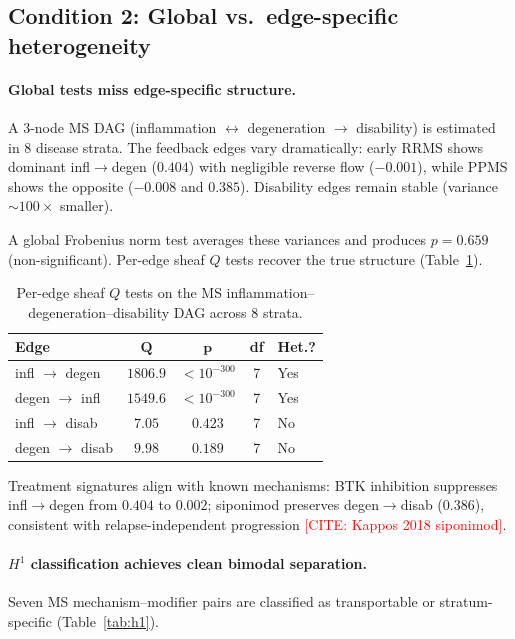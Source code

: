 \documentclass[11pt]{article}
\newcommand{\misscite}[1]{\textcolor{red}{[CITE: #1]}}
\begin{document}
\subsection{Condition 2: Global vs.\ edge-specific heterogeneity}
\label{sec:res-global-vs-edge}

\paragraph{Global tests miss edge-specific structure.}
A 3-node MS DAG (inflammation $\leftrightarrow$ degeneration $\to$ disability) is estimated in 8 disease strata.
The feedback edges vary dramatically: early RRMS shows dominant infl$\to$degen ($0.404$) with negligible reverse flow ($-0.001$), while PPMS shows the opposite ($-0.008$ and $0.385$).
Disability edges remain stable (variance $\sim\!100\times$ smaller).

A global Frobenius norm test averages these variances and produces $p = 0.659$ (non-significant).
Per-edge sheaf $Q$ tests recover the true structure (Table~\ref{tab:dag}).

\begin{table}[t]
\centering
\caption{Per-edge sheaf $Q$ tests on the MS inflammation--degeneration--disability DAG across 8 strata.}
\label{tab:dag}
\small
\begin{tabular}{@{}lcccl@{}}
\toprule
\textbf{Edge} & $\boldsymbol{Q}$ & $\boldsymbol{p}$ & \textbf{df} & \textbf{Het.?} \\
\midrule
infl $\to$ degen & $1806.9$ & $< 10^{-300}$ & 7 & Yes \\
degen $\to$ infl & $1549.6$ & $< 10^{-300}$ & 7 & Yes \\
infl $\to$ disab & $7.05$ & $0.423$ & 7 & No \\
degen $\to$ disab & $9.98$ & $0.189$ & 7 & No \\
\bottomrule
\end{tabular}
\end{table}

Treatment signatures align with known mechanisms: BTK inhibition suppresses infl$\to$degen from $0.404$ to $0.002$; siponimod preserves degen$\to$disab ($0.386$), consistent with relapse-independent progression \misscite{Kappos 2018 siponimod}.

\paragraph{$H^1$ classification achieves clean bimodal separation.}
Seven MS mechanism--modifier pairs are classified as transportable or stratum-specific (Table~\ref{tab:h1}).
\end{document}
